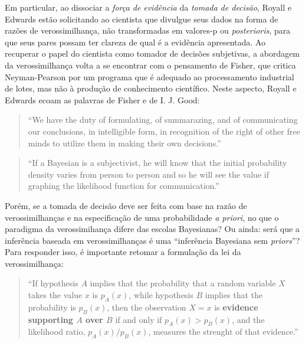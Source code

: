 Em particular, 
ao dissociar a {\em força de evidência} da {\em tomada de decisão}, Royall e Edwards estão solicitando ao cientista
que divulgue seus dados na forma de razões de verossimilhança, não transformadas em valores-p ou {\em posterioris}, para que
seus pares possam ter clareza de qual é a evidência apresentada. 
Ao recuperar o papel do cientista como tomador de decisões subjetivas, a abordagem da verossimilhança volta a se encontrar
com o pensamento de Fisher, que critica Neyman-Pearson por um programa que é adequado ao processamento industrial de lotes,
mas não à produção de conhecimento científico. Neste aspecto, Royall e Edwards ecoam as palavras de Fisher e de I. J. Good:

\begin{quote}
``We have the duty of formulating, of summarazing, and of communicating our conclusions, in intelligible form, in
recognition of the right of other free minds to utilize them in making their own decisions.'' \citep{Fisher1955}
\end{quote}

\begin{quote}
``If a Bayesian is a subjectivist, he will know that the initial probability density varies from person to person and
so he will see the value if graphing the likelihood function for communication.'' \citep{Good76}
\end{quote}

Porém, se a tomada de decisão deve ser feita com base na razão de verossimilhanças e na especificação de uma 
probabilidade {\em a priori}, no que o paradigma da verossimihança difere das escolas Bayesianas? Ou ainda: será que a 
inferência baseada em verossimilhanças é uma ``inferência Bayesiana sem {\em priors}''? Para responder isso,
é importante retomar a formulação da lei da verossimilhança:

\begin{quote}
``If hypothesis $A$ implies that the probability that a random variable $X$ takes the value $x$ is $p_A(x)$, while
hypothesis $B$ implies that the probability is $p_B(x)$, then the observation $X=x$ is \textbf{evidence supporting $A$ over $B$}
if and only if $p_A(x) > p_B(x)$, and the likelihood ratio, $p_A(x)/p_B(x)$, measures the strenght of that evidence.''
\citep{Hacking65}
\end{quote}

